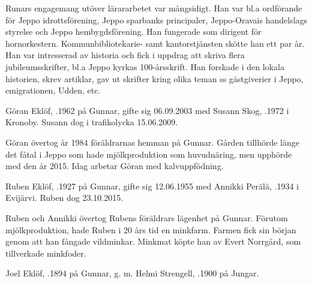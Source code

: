 Runars engagemang utöver lärararbetet var mångsidigt. Han var bl.a ordförande för  Jeppo idrottsförening, Jeppo sparbanks principaler, Jeppo-Oravais handelslags styrelse och Jeppo hembygdsförening. Han fungerade som dirigent för hornorkestern. Kommunbibliotekarie- samt kantorstjänsten skötte han ett par år. Han var intresserad av historia och fick i uppdrag att skriva flera jubileumsskrifter, bl.a Jeppo kyrkas 100-årsskrift. Han forskade i den lokala historien, skrev artiklar, gav ut skrifter kring olika teman ss gästgiverier i Jeppo, emigrationen, Udden, etc.






Göran Eklöf, .1962 på Gunnar, gifte sig 06.09.2003 med Susann Skog, .1972 i Kronoby. Susann dog i trafikolycka 15.06.2009.

\begin{jhchildren}
  \item {}
  \item {}
\end{jhchildren}

Göran övertog år 1984  föräldrarnas hemman på Gunnar. Gården tillhörde länge det fåtal i Jeppo som hade mjölkproduktion som huvudnäring, men upphörde med den år 2015. Idag arbetar Göran med kalvuppfödning.


Ruben Eklöf,  .1927 på Gunnar, gifte sig 12.06.1955 med Annikki  Perälä,  .1934 i Evijärvi. Ruben dog 23.10.2015.

\begin{jhchildren}
  \item {}
  \item {}
\end{jhchildren}

Ruben och Annikki övertog Rubens föräldrars lägenhet på Gunnar. Förutom mjölkproduktion, hade Ruben i 20 års tid en minkfarm. Farmen fick sin början genom att han fångade vildminkar. Minkmat köpte han av Evert Norrgård, som tillverkade minkfoder.


Joel Eklöf, .1894 på Gunnar, g. m. Helmi Strengell, .1900 på Jungar.

